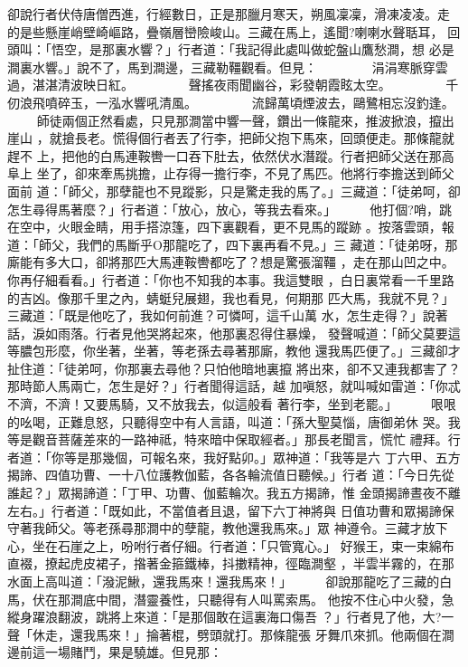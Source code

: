 \begin{pinyinscope}
{卻說行者伏侍唐僧西進，行經數日，正是那臘月寒天，朔風凜凜，滑凍凌凌。走
的是些懸崖峭壁崎嶇路，疊嶺層巒險峻山。三藏在馬上，遙聞?喇喇水聲聒耳，
回頭叫：「悟空，是那裏水響？」行者道：「我記得此處叫做蛇盤山鷹愁澗，想
必是澗裏水響。」說不了，馬到澗邊，三藏勒韁觀看。但見：
　　　　涓涓寒脈穿雲過，湛湛清波映日紅。
　　　　聲搖夜雨聞幽谷，彩發朝霞眩太空。
　　　　千仞浪飛噴碎玉，一泓水響吼清風。
　　　　流歸萬頃煙波去，鷗鷺相忘沒釣逢。
　　
師徒兩個正然看處，只見那澗當中響一聲，鑽出一條龍來，推波掀浪，攛出崖山
，就搶長老。慌得個行者丟了行李，把師父抱下馬來，回頭便走。那條龍就趕不
上，把他的白馬連鞍轡一口吞下肚去，依然伏水潛蹤。行者把師父送在那高阜上
坐了，卻來牽馬挑擔，止存得一擔行李，不見了馬匹。他將行李擔送到師父面前
道：「師父，那孽龍也不見蹤影，只是驚走我的馬了。」三藏道：「徒弟呵，卻
怎生尋得馬著麼？」行者道：「放心，放心，等我去看來。」
　　
他打個?哨，跳在空中，火眼金睛，用手搭涼篷，四下裏觀看，更不見馬的蹤跡
。按落雲頭，報道：「師父，我們的馬斷乎O那龍吃了，四下裏再看不見。」三
藏道：「徒弟呀，那廝能有多大口，卻將那匹大馬連鞍轡都吃了？想是驚張溜韁
，走在那山凹之中。你再仔細看看。」行者道：「你也不知我的本事。我這雙眼
，白日裏常看一千里路的吉凶。像那千里之內，蜻蜓兒展翅，我也看見，何期那
匹大馬，我就不見？」三藏道：「既是他吃了，我如何前進？可憐呵，這千山萬
水，怎生走得？」說著話，淚如雨落。行者見他哭將起來，他那裏忍得住暴燥，
發聲喊道：「師父莫要這等膿包形麼，你坐著，坐著，等老孫去尋著那廝，教他
還我馬匹便了。」三藏卻才扯住道：「徒弟呵，你那裏去尋他？只怕他暗地裏攛
將出來，卻不又連我都害了？那時節人馬兩亡，怎生是好？」行者聞得這話，越
加嗔怒，就叫喊如雷道：「你忒不濟，不濟！又要馬騎，又不放我去，似這般看
著行李，坐到老罷。」
　　
哏哏的吆喝，正難息怒，只聽得空中有人言語，叫道：「孫大聖莫惱，唐御弟休
哭。我等是觀音菩薩差來的一路神祗，特來暗中保取經者。」那長老聞言，慌忙
禮拜。行者道：「你等是那幾個，可報名來，我好點卯。」眾神道：「我等是六
丁六甲、五方揭諦、四值功曹、一十八位護教伽藍，各各輪流值日聽候。」行者
道：「今日先從誰起？」眾揭諦道：「丁甲、功曹、伽藍輪次。我五方揭諦，惟
金頭揭諦晝夜不離左右。」行者道：「既如此，不當值者且退，留下六丁神將與
日值功曹和眾揭諦保守著我師父。等老孫尋那澗中的孽龍，教他還我馬來。」眾
神遵令。三藏才放下心，坐在石崖之上，吩咐行者仔細。行者道：「只管寬心。」
好猴王，束一束綿布直裰，撩起虎皮裙子，揝著金箍鐵棒，抖擻精神，徑臨澗壑
，半雲半霧的，在那水面上高叫道：「潑泥鰍，還我馬來！還我馬來！」
　　
卻說那龍吃了三藏的白馬，伏在那澗底中間，潛靈養性，只聽得有人叫罵索馬。
他按不住心中火發，急縱身躍浪翻波，跳將上來道：「是那個敢在這裏海口傷吾
？」行者見了他，大?一聲「休走，還我馬來！」掄著棍，劈頭就打。那條龍張
牙舞爪來抓。他兩個在澗邊前這一場賭鬥，果是驍雄。但見那：
}
\end{pinyinscope}
